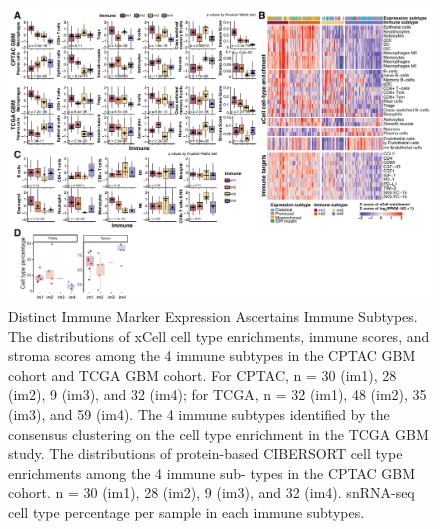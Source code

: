 \begin{figure}[tbp]
    \centering
    \includegraphics[width=\linewidth]{figures/chap04_cptac_gbm_discov/figures5_immune.pdf}
    \caption[Distinct Immune Marker Expression Ascertains Immune Subtypes.]{%
        Distinct Immune Marker Expression Ascertains Immune Subtypes.
        The distributions of xCell cell type enrichments, immune scores, and stroma scores among the 4 immune subtypes in the CPTAC GBM cohort and TCGA GBM cohort. For CPTAC, n = 30 (im1), 28 (im2), 9 (im3), and 32 (im4); for TCGA, n = 32 (im1), 48 (im2), 35 (im3), and 59 (im4).
        The 4 immune subtypes identified by the consensus clustering on the cell type enrichment in the TCGA GBM study.
        The distributions of protein-based CIBERSORT cell type enrichments among the 4 immune sub- types in the CPTAC GBM cohort. n = 30 (im1), 28 (im2), 9 (im3), and 32 (im4).
        snRNA-seq cell type percentage per sample in each immune subtypes.
    }
    \label{fig:gbm-immune-valid}
\end{figure}


